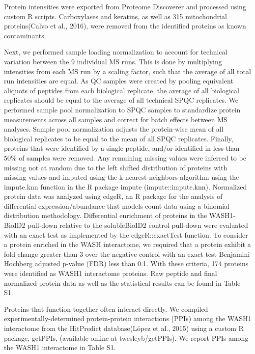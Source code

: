 Protein intensities were exported from Proteome Discoverer and processed using
custom R scripts. Carboxylases and keratins, as well as 315 mitochondrial
proteins(Calvo et al., 2016), were removed from the identified proteins as known
contaminants.

Next, we performed sample loading normalization to account for
technical variation between the 9 individual MS runs. This is done by
multiplying intensities from each MS run by a scaling factor, such that the
average of all total run intensities are equal. As QC samples were created by
pooling equivalent aliquots of peptides from each biological replicate, the
average of all biological replicates should be equal to the average of all
technical SPQC replicates. We performed sample pool normalization to SPQC
samples to standardize protein measurements across all samples and correct for
batch effects between MS analyses. Sample pool normalization adjusts the
protein-wise mean of all biological replicates to be equal to the mean of all
SPQC replicates. Finally, proteins that were identified by a single peptide,
and/or identified in less than 50\% of samples were removed. Any remaining
missing values were inferred to be missing not at random due to the left shifted
distribution of proteins with missing values and imputed using the k-nearest
neighbors algorithm using the impute.knn function in the R package impute
(impute::impute.knn). Normalized protein data was analyzed using edgeR, an R
package for the analysis of differential expression/abundance that models count
data using a binomial distribution methodology. Differential enrichment of
proteins in the WASH1-BioID2 pull-down relative to the solubleBioID2 control
pull-down were evaluated with an exact test as implemented by the
edgeR::exactTest function. To consider a protein enriched in the WASH
interactome, we required that a protein exhibit a fold change greater than 3
over the negative control with an exact test Benjamini Hochberg adjusted p-value
(FDR) less than 0.1. With these criteria, 174 proteins were identified as WASH1
interactome proteins. Raw peptide and final normalized protein data as well as
the statistical results can be found in Table S1.

Proteins that function together often interact directly. We compiled
experimentally-determined protein-protein interactions (PPIs) among the WASH1
interactome from the HitPredict database(López et al., 2015) using a custom R
package, getPPIs, (available online at twesleyb/getPPIs). We report PPIs among
the WASH1 interactome in Table S1.

